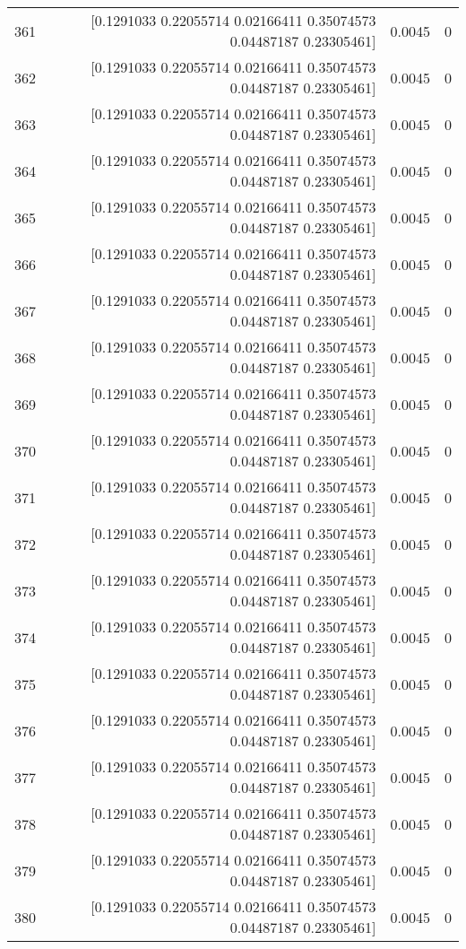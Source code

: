 \begin{longtable}{lrrr}
361 & [0.1291033  0.22055714 0.02166411 0.35074573 0.04487187 0.23305461] & 0.0045 & 0 \\
362 & [0.1291033  0.22055714 0.02166411 0.35074573 0.04487187 0.23305461] & 0.0045 & 0 \\
363 & [0.1291033  0.22055714 0.02166411 0.35074573 0.04487187 0.23305461] & 0.0045 & 0 \\
364 & [0.1291033  0.22055714 0.02166411 0.35074573 0.04487187 0.23305461] & 0.0045 & 0 \\
365 & [0.1291033  0.22055714 0.02166411 0.35074573 0.04487187 0.23305461] & 0.0045 & 0 \\
366 & [0.1291033  0.22055714 0.02166411 0.35074573 0.04487187 0.23305461] & 0.0045 & 0 \\
367 & [0.1291033  0.22055714 0.02166411 0.35074573 0.04487187 0.23305461] & 0.0045 & 0 \\
368 & [0.1291033  0.22055714 0.02166411 0.35074573 0.04487187 0.23305461] & 0.0045 & 0 \\
369 & [0.1291033  0.22055714 0.02166411 0.35074573 0.04487187 0.23305461] & 0.0045 & 0 \\
370 & [0.1291033  0.22055714 0.02166411 0.35074573 0.04487187 0.23305461] & 0.0045 & 0 \\
371 & [0.1291033  0.22055714 0.02166411 0.35074573 0.04487187 0.23305461] & 0.0045 & 0 \\
372 & [0.1291033  0.22055714 0.02166411 0.35074573 0.04487187 0.23305461] & 0.0045 & 0 \\
373 & [0.1291033  0.22055714 0.02166411 0.35074573 0.04487187 0.23305461] & 0.0045 & 0 \\
374 & [0.1291033  0.22055714 0.02166411 0.35074573 0.04487187 0.23305461] & 0.0045 & 0 \\
375 & [0.1291033  0.22055714 0.02166411 0.35074573 0.04487187 0.23305461] & 0.0045 & 0 \\
376 & [0.1291033  0.22055714 0.02166411 0.35074573 0.04487187 0.23305461] & 0.0045 & 0 \\
377 & [0.1291033  0.22055714 0.02166411 0.35074573 0.04487187 0.23305461] & 0.0045 & 0 \\
378 & [0.1291033  0.22055714 0.02166411 0.35074573 0.04487187 0.23305461] & 0.0045 & 0 \\
379 & [0.1291033  0.22055714 0.02166411 0.35074573 0.04487187 0.23305461] & 0.0045 & 0 \\
380 & [0.1291033  0.22055714 0.02166411 0.35074573 0.04487187 0.23305461] & 0.0045 & 0 \\

\end{longtable}
